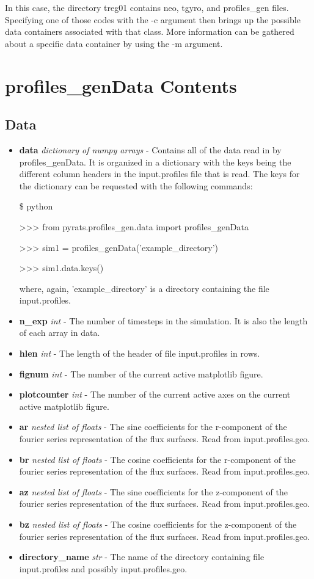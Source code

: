 \documentclass{article}
\begin{document}
\noindent In this case, the directory treg01 contains neo, tgyro, and profiles\_gen files.  Specifying one of those codes with the -c argument then brings up the possible data containers associated with that class.  More information can be gathered about a specific data container by using the -m argument.

\newpage

\section{profiles\_genData Contents}
\subsection{Data}
\begin{itemize}
\item \textbf{data} \emph{dictionary of numpy arrays} - Contains all of the data read in by profiles\_genData.  It is organized in a dictionary with the keys being the different column headers in the input.profiles file that is read.  The keys for the dictionary can be requested with the following commands:
\fontfamily{\ttdefault}\selectfont

\$ python

>>> from pyrats.profiles\_gen.data import profiles\_genData

>>> sim1 = profiles\_genData('example\_directory')

>>> sim1.data.keys()

\fontfamily{\rmdefault}\selectfont
\noindent where, again, 'example\_directory' is a directory containing the file input.profiles.
\item \textbf{n\_exp} \emph{int} - The number of timesteps in the simulation.  It is also the length of each array in data.
\item \textbf{hlen} \emph{int} - The length of the header of file input.profiles in rows.
\item \textbf{fignum} \emph{int} - The number of the current active matplotlib figure.
\item \textbf{plotcounter} \emph{int} - The number of the current active axes on the current active matplotlib figure.
\item \textbf{ar} \emph{nested list of floats} - The sine coefficients for the r-component of the fourier series representation of the flux surfaces.  Read from input.profiles.geo.
\item \textbf{br} \emph{nested list of floats} - The cosine coefficients for the r-component of the fourier series representation of the flux surfaces.  Read from input.profiles.geo.
\item \textbf{az} \emph{nested list of floats} - The sine coefficients for the z-component of the fourier series representation of the flux surfaces.  Read from input.profiles.geo.
\item \textbf{bz} \emph{nested list of floats} - The cosine coefficients for the z-component of the fourier series representation of the flux surfaces.  Read from input.profiles.geo.
\item \textbf{directory\_name} \emph{str} - The name of the directory containing file input.profiles and possibly input.profiles.geo.
\end{itemize}
\end{document}
